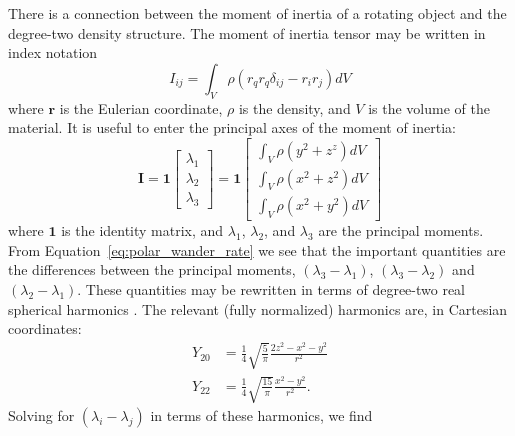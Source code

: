 \documentclass[preprint,12pt,authoryear]{elsarticle}
\newif\ifdetail
\begin{document}
There is a connection between the moment of inertia of a rotating object and the degree-two density structure.
The moment of inertia tensor may be written in index notation
\begin{equation}
I_{ij} = \int_V \rho \left( r_q r_q \delta_{ij} - r_i r_j \right) dV
\label{eq:inertia}
\end{equation}
where $\mathbf{r}$ is the Eulerian coordinate, $\rho$ is the density, and $V$ is the volume of the material.  
It is useful to enter the principal axes of the moment of inertia:
\begin{equation}
\mathbf{I} = \mathbf{1} \begin{bmatrix}
\lambda_1 \\ \lambda_2 \\ \lambda_3
\end{bmatrix} = 
\mathbf{1} \begin{bmatrix}
\int_V \rho (y^2+z^z) dV\\
\int_V \rho (x^2+z^2) dV\\
\int_V \rho (x^2+y^2) dV
\end{bmatrix}
\end{equation}
where $\mathbf{1}$ is the identity matrix, and $\lambda_1$, $\lambda_2$, and $\lambda_3$ are the principal moments.
From Equation~\eqref{eq:polar_wander_rate} we see that the important quantities are the differences between the 
principal moments, $(\lambda_3-\lambda_1)$, $(\lambda_3-\lambda_2)$ and $(\lambda_2-\lambda_1)$.
These quantities may be rewritten in terms of degree-two real spherical harmonics \citep[e.g.][]{dahlen1999theoretical}.
The relevant (fully normalized) harmonics are, in Cartesian coordinates:
\begin{equation}
\begin{aligned}
Y_{20} &= \frac{1}{4} \sqrt{\frac{ 5}{\pi}} \frac{ 2 z^2 - x^2 - y^2}{r^2} \\ 
Y_{22} &= \frac{1}{4} \sqrt{\frac{15}{\pi}} \frac{ x^2 - y^2}{r^2}.
\end{aligned}
\end{equation}
Solving for $( \lambda_i - \lambda_j )$ in terms of these harmonics, we find
\ifdetail
\end{document}
